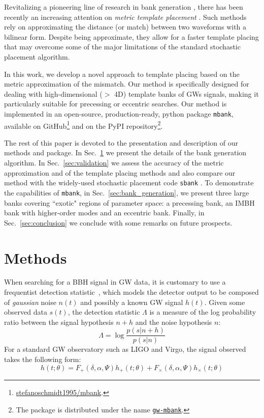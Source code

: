 \documentclass[twocolumn,showpacs,preprintnumbers,nofootinbib,prd,
superscriptaddress,10pt]{revtex4-2}
\begin{document}
Revitalizing a pioneering line of research in bank generation \cite{owen_metric, Messenger:2008ta, Prix:2007ks, Brown:2012qf, Keppel:2013uma}, there has been recently an increasing attention on {\it metric template placement} \cite{Roy:2017oul, 2018cosp...42E2899R, Coogan:2022qxs, Hanna:2022zpk}.
Such methods rely on approximating the distance (or match) between two waveforms with a bilinear form. Despite being approximate, they allow for a faster template placing that may overcome some of the major limitations of the standard stochastic placement algorithm.

In this work, we develop a novel approach to template placing based on the metric approximation of the mismatch.
Our method is specifically designed for dealing with high-dimensional ($>$ 4D) template banks of GWs signals, making it particularly suitable for precessing or eccentric searches.
Our method is implemented in an open-source, production-ready, python package \texttt{mbank}, available on GitHub\footnote{
\href{https://github.com/stefanoschmidt1995/mbank}{stefanoschmidt1995/mbank}.}
and on the PyPI repository\footnote{
The package is distributed under the name \texttt{\href{https://pypi.org/project/gw-mbank/}{gw-mbank}}.
}.

The rest of this paper is devoted to the presentation and description of our methods and package.
In Sec.~\ref{sec:methods} we present the details of the bank generation algorithm.
In Sec.~\ref{sec:validation} we assess the accuracy of the metric approximation and of the template placing methods and also compare our method with the widely-used stochastic placement code \texttt{sbank} \cite{Ajith:2012mn}.
To demonstrate the capabilities of \texttt{mbank}, in Sec.~\ref{sec:bank_generation}, we present three large banks covering ``exotic" regions of parameter space: a precessing bank, an IMBH bank with higher-order modes and an eccentric bank.
Finally, in Sec.~\ref{sec:conclusion} we conclude with some remarks on future prospects.

\section{Methods} \label{sec:methods}

When searching for a BBH signal in GW data, it is customary to use a frequentist detection statistic~\cite{Creighton_book, Maggiore:2007ulw, Harry:2016ijz, Harry:2017weg}, which models the detector output to be composed of {\it gaussian} noise $n(t)$ and possibly a known GW signal $h(t)$.
Given some observed data $s(t)$, the detection statistic $\Lambda$ is a measure of the log probability ratio between the signal hypothesis $n+h$ and the noise hypothesis $n$:
\begin{equation}\label{eq:LL}
	\Lambda = \log\frac{p(s|n+h)}{p(s| n)}
\end{equation}
For a standard GW observatory such as LIGO and Virgo, the signal observed takes the following form:
\begin{equation}\label{eq:signal_model}
	h(t;\theta) = F_+(\delta, \alpha, \Psi) h_+(t;\theta) + F_\times(\delta, \alpha, \Psi) h_\times(t;\theta)
\end{equation}
\end{document}
